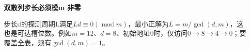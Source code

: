 {\color{ink}\bfseries 双散列步长必须模m 非零}\par\vspace{1bp}步长d的探测周期L满足\(Ld\equiv 0(\operatorname{mod} m)\)，最小正解为\(L=\allowbreak{}m/\allowbreak{}\operatorname{gcd}(d,\allowbreak{}m)\)，这也是可达槽位数。例如\(m=\allowbreak{}12\)、\(d=\allowbreak{}8\)、初始地址0时，仅访问0\(\to \)8\(\to \)4\(\to \)0；要覆盖全表，须有\(\operatorname{gcd}(d,\allowbreak{}m)=\allowbreak{}1\)。
